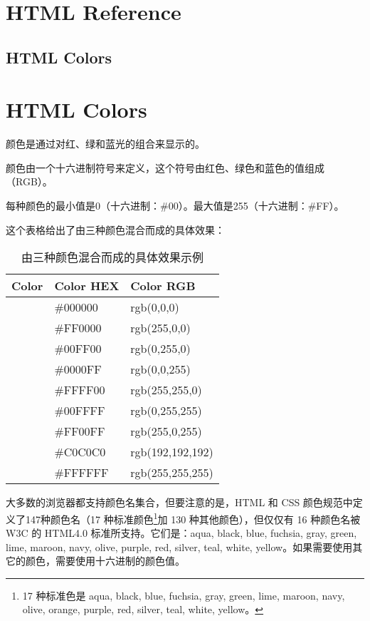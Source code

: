 \part{HTML Reference}



\chapter{HTML Colors}


\part{HTML Colors}

颜色是通过对红、绿和蓝光的组合来显示的。

颜色由一个十六进制符号来定义，这个符号由红色、绿色和蓝色的值组成（RGB）。

每种颜色的最小值是0（十六进制：\#00）。最大值是255（十六进制：\#FF）。

这个表格给出了由三种颜色混合而成的具体效果：

\begin{table}[!h]
\centering
\caption{由三种颜色混合而成的具体效果示例}
\begin{tabular}{|p{100pt}|p{100pt}|p{100pt}|}
\hline
Color				&Color HEX		&Color RGB		\\
\hline
\cellcolor{Black}	&\#000000		&rgb(0,0,0)		\\
\hline
\cellcolor{Red}	&\#FF0000		&rgb(255,0,0)	\\
\hline
\cellcolor{Green}	&\#00FF00		&rgb(0,255,0)	\\
\hline
\cellcolor{Blue}	&\#0000FF		&rgb(0,0,255)	\\
\hline
\cellcolor{Yellow}	&\#FFFF00		&rgb(255,255,0)	\\
\hline
\cellcolor{Cyan}	&\#00FFFF		&rgb(0,255,255)	\\
\hline
\cellcolor{Magenta}	&\#FF00FF		&rgb(255,0,255)	\\
\hline
\cellcolor{Silver}	&\#C0C0C0		&rgb(192,192,192)\\
\hline
\cellcolor{White}	&\#FFFFFF		&rgb(255,255,255)\\
\hline
\end{tabular}
\end{table}

大多数的浏览器都支持颜色名集合，但要注意的是，HTML 和 CSS 颜色规范中定义了147种颜色名（17 种标准颜色\footnote{17 种标准色是 aqua, black, blue, fuchsia, gray, green, lime, maroon, navy, olive, orange, purple, red, silver, teal, white, yellow。}加 130 种其他颜色），但仅仅有 16 种颜色名被 W3C 的 HTML4.0 标准所支持。它们是：aqua, black, blue, fuchsia, gray, green, lime, maroon, navy, olive, purple, red, silver, teal, white, yellow。如果需要使用其它的颜色，需要使用十六进制的颜色值。

